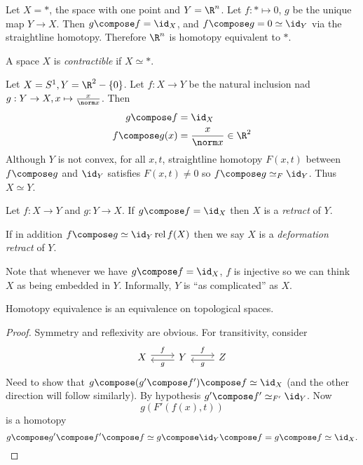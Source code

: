 \documentclass[a4paper]{article}
\DeclareMathOperator{\rel}{rel}
\begin{document}
\begin{eg}
  Let \(X = *\), the space with one point and \(Y = \R^n\). Let \(f: * \mapsto 0\), \(g\) be the unique map \(Y \to X\). Then \(g \compose f = \id_X\), and \(f \compose g = 0 \simeq \id_Y\) via the straightline homotopy. Therefore \(\R^n\) is homotopy equivalent to \(*\).
\end{eg}

\begin{definition}[contractible]
  A space \(X\) is \emph{contractible} if \(X \simeq *\).
\end{definition}

\begin{eg}
  Let \(X = S^1, Y = \R^2 - \{0\}\). Let \(f: X \to Y\) be the natural inclusion nad \(g: Y \to X, x \mapsto \frac{x}{\norm x}\). Then
  \begin{align*}
    g \compose f &= \id_X \\
    f \compose g(x) &= \frac{x}{\norm x} \in \R^2
  \end{align*}
  Although \(Y\) is not convex, for all \(x, t\), straightline homotopy \(F(x, t)\) between \(f \compose g\) and \(\id_Y\) satisfies \(F(x, t) \neq 0\) so \(f \compose g \simeq_F \id_Y\). Thus \(X \simeq Y\).
\end{eg}

\begin{definition}
  Let \(f: X \to Y\) and \(g: Y \to X\). If \(g \compose f = \id_X\) then \(X\) is a \emph{retract} of \(Y\).

  If in addition \(f \compose g \simeq \id_Y \rel f(X)\) then we say \(X\) is a \emph{deformation retract} of \(Y\).
\end{definition}

Note that whenever we have \(g \compose f = \id_X\), \(f\) is injective so we can think \(X\) as being embedded in \(Y\). Informally, \(Y\) is ``as complicated'' as \(X\).

\begin{lemma}
  Homotopy equivalence is an equivalence on topological spaces.
\end{lemma}

\begin{proof}
  Symmetry and reflexivity are obvious. For transitivity, consider
  \[
    \begin{tikzcd}
      X \ar[r, "f", shift left] & Y \ar[l, "g", shift left] \ar[r, "f", shift left] & Z \ar[l, "g", shift left]
    \end{tikzcd}
  \]
  Need to show that \(g \compose (g' \compose f') \compose f \simeq \id_X\) (and the other direction will follow similarly). By hypothesis \(g' \compose f' \simeq_{F'} \id_Y\). Now
  \[
    g(F'(f(x), t))
  \]
  is a homotopy
  \[
    g \compose g' \compose f' \compose f \simeq g \compose \id_Y \compose f = g \compose f \simeq \id_X.
  \]
\end{proof}
\end{document}

